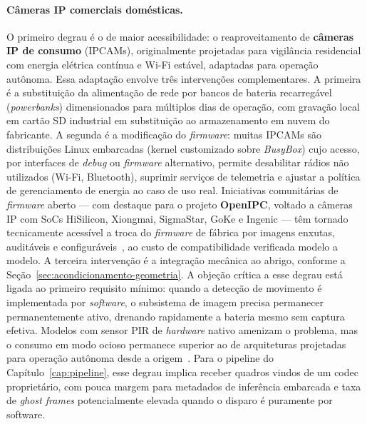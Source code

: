 \paragraph*{Câmeras IP comerciais domésticas.} O primeiro degrau é o de maior acessibilidade: o reaproveitamento de \textbf{câmeras IP de consumo} (IPCAMs), originalmente projetadas para vigilância residencial com energia elétrica contínua e Wi-Fi estável, adaptadas para operação autônoma. Essa adaptação envolve três intervenções complementares. A primeira é a substituição da alimentação de rede por bancos de bateria recarregável (\emph{powerbanks}) dimensionados para múltiplos dias de operação, com gravação local em cartão SD industrial em substituição ao armazenamento em nuvem do fabricante. A segunda é a modificação do \emph{firmware}: muitas IPCAMs são distribuições Linux embarcadas (kernel customizado sobre \emph{BusyBox}) cujo acesso, por interfaces de \emph{debug} ou \emph{firmware} alternativo, permite desabilitar rádios não utilizados (Wi-Fi, Bluetooth), suprimir serviços de telemetria e ajustar a política de gerenciamento de energia ao caso de uso real. Iniciativas comunitárias de \emph{firmware} aberto --- com destaque para o projeto \textbf{OpenIPC}, voltado a câmeras IP com SoCs HiSilicon, Xiongmai, SigmaStar, GoKe e Ingenic --- têm tornado tecnicamente acessível a troca do \emph{firmware} de fábrica por imagens enxutas, auditáveis e configuráveis~\cite{openipc2025}, ao custo de compatibilidade verificada modelo a modelo. A terceira intervenção é a integração mecânica ao abrigo, conforme a Seção~\ref{sec:acondicionamento-geometria}. A objeção crítica a esse degrau está ligada ao primeiro requisito mínimo: quando a detecção de movimento é implementada por \emph{software}, o subsistema de imagem precisa permanecer permanentemente ativo, drenando rapidamente a bateria mesmo sem captura efetiva. Modelos com sensor PIR de \emph{hardware} nativo amenizam o problema, mas o consumo em modo ocioso permanece superior ao de arquiteturas projetadas para operação autônoma desde a origem~\cite{velasco2024smartcameratraps}. Para o pipeline do Capítulo~\ref{cap:pipeline}, esse degrau implica receber quadros vindos de um codec proprietário, com pouca margem para metadados de inferência embarcada e taxa de \emph{ghost frames} potencialmente elevada quando o disparo é puramente por software.


